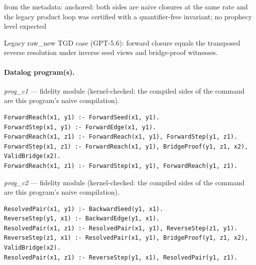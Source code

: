 \documentclass[10pt]{article}
\begin{document}
\begin{description}[leftmargin=2.6cm,style=nextline,itemsep=1pt]
\item[Obstruction note] from the metadata: anchored: both sides are naive closures at the same rate and the legacy product loop was certified with a quantifier-free invariant; no prophecy level expected

\item[Note] Legacy raw\_new TGD case (GPT-5.6): forward closure equals the transposed reverse resolution under inverse seed views and bridge-proof witnesses.

\end{description}

\paragraph{Datalog program(s).}

{\raggedright\textit{prog\_c1} --- fidelity module (kernel-checked: the compiled sides of the command are this program's naive compilation).\par}

\begin{Verbatim}[fontsize=\scriptsize,breaklines=true,breakanywhere=true,frame=single,framesep=1.5mm]
ForwardReach(x1, y1) :- ForwardSeed(x1, y1).
ForwardStep(x1, y1) :- ForwardEdge(x1, y1).
ForwardReach(x1, z1) :- ForwardReach(x1, y1), ForwardStep(y1, z1).
ForwardStep(x1, z1) :- ForwardReach(x1, y1), BridgeProof(y1, z1, x2), ValidBridge(x2).
ForwardReach(x1, z1) :- ForwardStep(x1, y1), ForwardReach(y1, z1).
\end{Verbatim}

{\raggedright\textit{prog\_c2} --- fidelity module (kernel-checked: the compiled sides of the command are this program's naive compilation).\par}

\begin{Verbatim}[fontsize=\scriptsize,breaklines=true,breakanywhere=true,frame=single,framesep=1.5mm]
ResolvedPair(x1, y1) :- BackwardSeed(y1, x1).
ReverseStep(y1, x1) :- BackwardEdge(y1, x1).
ResolvedPair(x1, z1) :- ResolvedPair(x1, y1), ReverseStep(z1, y1).
ReverseStep(z1, x1) :- ResolvedPair(x1, y1), BridgeProof(y1, z1, x2), ValidBridge(x2).
ResolvedPair(x1, z1) :- ReverseStep(y1, x1), ResolvedPair(y1, z1).
\end{Verbatim}
\end{document}
